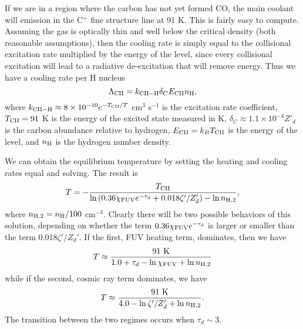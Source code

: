 If we are in a region where the carbon has not yet formed CO, the main coolant will emission in the C$^+$ fine structure line at 91 K. This is fairly easy to compute. Assuming the gas is optically thin and well below the critical density (both reasonable assumptions), then the cooling rate is simply equal to the collisional excitation rate multiplied by the energy of the level, since every collisional excitation will lead to a radiative de-excitation that will remove energy. Thus we have a cooling rate per H nucleus
\begin{equation}
\Lambda_{\rm CII} = k_{\rm CII-H} \delta_C E_{\rm CII} n_{\rm H},
\end{equation}
where $k_{\rm CII-H} \approx 8\times 10^{-10} e^{-T_{\rm CII}/T}$ cm$^3$ s$^{-1}$ is the excitation rate coefficient, $T_{\rm CII} = 91$ K is the energy of the excited state measured in K, $\delta_C\approx 1.1\times 10^{-4} Z'_d$ is the carbon abundance relative to hydrogen, $E_{\rm CII} = k_B T_{\rm CII}$ is the energy of the level, and $n_{\rm H}$ is the hydrogen number density.

We can obtain the equilibrium temperature by setting the heating and cooling rates equal and solving. The result is
\begin{equation}
T = -\frac{T_{\rm CII}}{\ln \left( 0.36 \chi_{\rm FUV} e^{-\tau_d} + 0.018 \zeta'/Z'_d\right) - \ln n_{\rm H,2}},
\end{equation}
where $n_{\rm H,2} = n_{\rm H}/100$ cm$^{-3}$. Clearly there will be two possible behaviors of this solution, depending on whether the term $0.36 \chi_{\rm FUV} e^{-\tau_d}$ is larger or smaller than the term $0.018\zeta'/Z_d'$. If the first, FUV heating term, dominates, then we have
\begin{equation}
T \approx \frac{91\mbox{ K}}{1.0 + \tau_d - \ln \chi_{\rm FUV} + \ln n_{\rm H,2}}
\end{equation}
while if the second, cosmic ray term dominates, we have
\begin{equation}
T \approx \frac{91\mbox{ K}}{4.0 - \ln \zeta'/Z'_d + \ln n_{\rm H,2}}.
\end{equation}
The transition between the two regimes occurs when $\tau_d \sim 3$.

